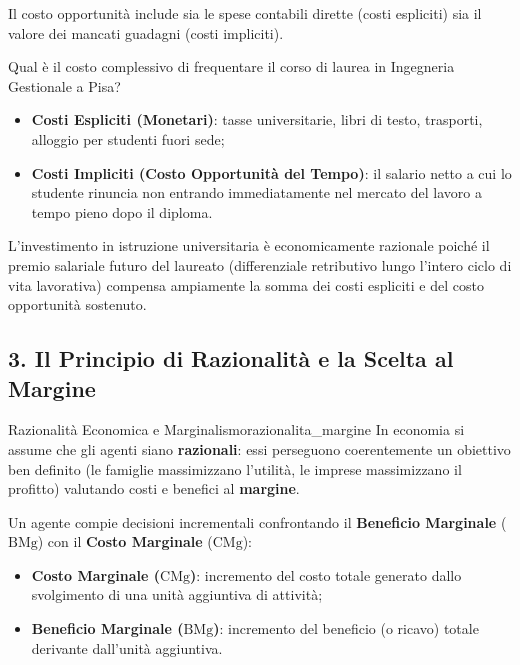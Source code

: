 \begin{osservazione}
Il costo opportunità include sia le spese contabili dirette (costi espliciti) sia il valore dei mancati guadagni (costi impliciti).
\end{osservazione}

\begin{esempio}
Qual è il costo complessivo di frequentare il corso di laurea in Ingegneria Gestionale a Pisa?
\begin{itemize}
    \item \textbf{Costi Espliciti (Monetari)}: tasse universitarie, libri di testo, trasporti, alloggio per studenti fuori sede;
    \item \textbf{Costi Impliciti (Costo Opportunità del Tempo)}: il salario netto a cui lo studente rinuncia non entrando immediatamente nel mercato del lavoro a tempo pieno dopo il diploma.
\end{itemize}
L'investimento in istruzione universitaria è economicamente razionale poiché il premio salariale futuro del laureato (differenziale retributivo lungo l'intero ciclo di vita lavorativa) compensa ampiamente la somma dei costi espliciti e del costo opportunità sostenuto.
\end{esempio}

\subsection{3. Il Principio di Razionalità e la Scelta al Margine}

\begin{definizione}{Razionalità Economica e Marginalismo}{razionalita_margine}
In economia si assume che gli agenti siano \textbf{razionali}: essi perseguono coerentemente un obiettivo ben definito (le famiglie massimizzano l'utilità, le imprese massimizzano il profitto) valutando costi e benefici al \textbf{margine}.

Un agente compie decisioni incrementali confrontando il \textbf{Beneficio Marginale} ($\mathrm{BMg}$) con il \textbf{Costo Marginale} ($\mathrm{CMg}$):
\begin{itemize}
    \item \textbf{Costo Marginale ($\mathrm{CMg}$)}: incremento del costo totale generato dallo svolgimento di una unità aggiuntiva di attività;
    \item \textbf{Beneficio Marginale ($\mathrm{BMg}$)}: incremento del beneficio (o ricavo) totale derivante dall'unità aggiuntiva.
\end{itemize}
\end{definizione}

